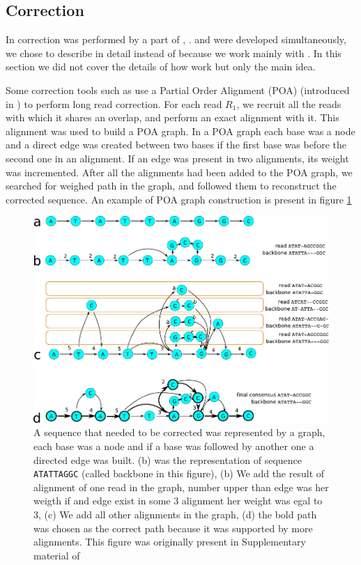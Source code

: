 \documentclass[main]{subfiles}
\begin{document}
\subsection{Correction}

In \canu correction was performed by a part of  \cite{falcon}, .  and \canu were developed simultaneously, we chose to describe \canu in detail instead of  because we work mainly with \canu. In this section we did not cover the details of how  work but only the main idea.

Some correction tools such as  use a Partial Order Alignment (POA) (introduced in \cite{poa}) to perform long read correction. For each read \texttt{$R_1$}, we recruit all the reads with which it shares an overlap, and perform an exact alignment with it. This alignment was used to build a POA graph. In a POA graph each base was a node and a direct edge was created between two bases if the first base was before the second one in an alignment. If an edge was present in two alignments, its weight was incremented. After all the alignments had been added to the POA graph, we searched for weighed path in the graph, and followed them to reconstruct the corrected sequence. An example of POA graph construction is present in figure \ref{sota:fig:canu:correction}

\begin{figure}[ht]
    \centering
    \includegraphics[width=\textwidth]{state_of_the_art/images/POA_explain.pdf}
    \caption{A sequence that needed to be corrected was represented by a graph, each base was a node and if a base was followed by another one a directed edge was built. (b) was the representation of sequence \texttt{ATATTAGGC} (called backbone in this figure), (b) We add the result of alignment of one read in the graph, number upper than edge was her weigth if and edge exist in some 3 alignment her weight was egal to 3, (c) We add all other alignments in the graph, (d) the bold path was chosen as the correct path because it was supported by more alignments. This figure was originally present in Supplementary material of \hgap \cite{hgap}}
    \label{sota:fig:canu:correction}
\end{figure}
\end{document}
